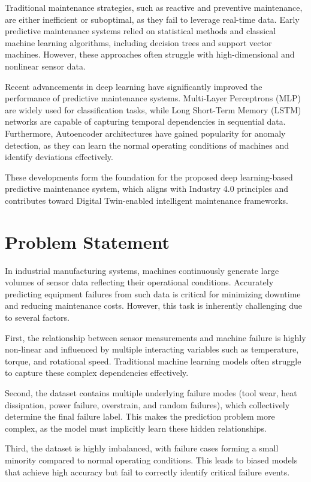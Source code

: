 \documentclass{ecsproject}     %
\begin{document}
Traditional maintenance strategies, such as reactive and preventive maintenance, are either inefficient or suboptimal, as they fail to leverage real-time data. Early predictive maintenance systems relied on statistical methods and classical machine learning algorithms, including decision trees and support vector machines. However, these approaches often struggle with high-dimensional and nonlinear sensor data.

Recent advancements in deep learning have significantly improved the performance of predictive maintenance systems. Multi-Layer Perceptrons (MLP) are widely used for classification tasks, while Long Short-Term Memory (LSTM) networks are capable of capturing temporal dependencies in sequential data. Furthermore, Autoencoder architectures have gained popularity for anomaly detection, as they can learn the normal operating conditions of machines and identify deviations effectively.

These developments form the foundation for the proposed deep learning-based predictive maintenance system, which aligns with Industry 4.0 principles and contributes toward Digital Twin-enabled intelligent maintenance frameworks.


\chapter{Problem Statement}

In industrial manufacturing systems, machines continuously generate large volumes of sensor data reflecting their operational conditions. Accurately predicting equipment failures from such data is critical for minimizing downtime and reducing maintenance costs. However, this task is inherently challenging due to several factors.

First, the relationship between sensor measurements and machine failure is highly non-linear and influenced by multiple interacting variables such as temperature, torque, and rotational speed. Traditional machine learning models often struggle to capture these complex dependencies effectively.

Second, the dataset contains multiple underlying failure modes (tool wear, heat dissipation, power failure, overstrain, and random failures), which collectively determine the final failure label. This makes the prediction problem more complex, as the model must implicitly learn these hidden relationships.

Third, the dataset is highly imbalanced, with failure cases forming a small minority compared to normal operating conditions. This leads to biased models that achieve high accuracy but fail to correctly identify critical failure events.
\end{document}
